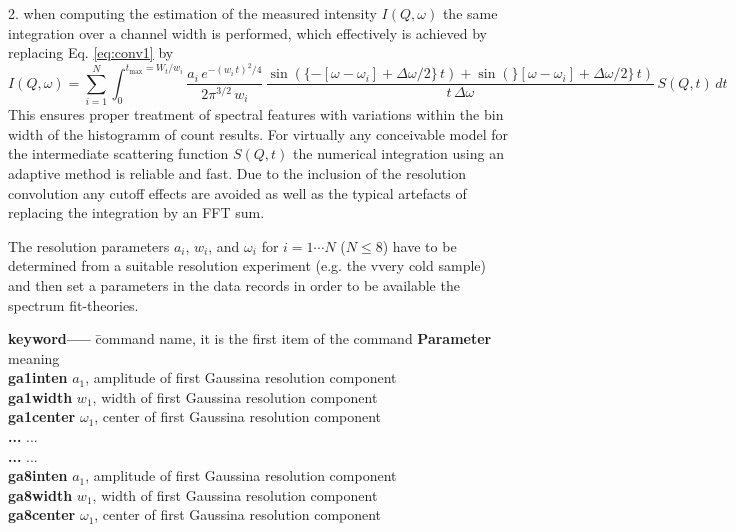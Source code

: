 \documentclass[11pt,fleqn]{book} %
\newcommand{\linespace}{\vspace{4ex}}
\begin{document}
2. when computing the estimation of the measured intensity $I(Q,\omega)$ the same
integration over a channel width is performed, which effectively is achieved by
replacing Eq. \ref{eq:conv1} by
\begin{equation}
\label{eq:conv1}
I(Q,\omega) = \sum_{i=1}^{N} { \int_0^{t_{\max} = W_t/w_i} {
\frac{a_i \, e^{-(w_i \, t)^2/4}}{ 2 \pi^{3/2} \, w_i } \, 
\frac{ 
\sin(\{-[\omega-\omega_i]+\Delta\omega/2\}\, t)+\sin(\}[\omega-\omega_i]+\Delta\omega/2\}\, t)
}{
t \, \Delta\omega
} 
\, S(Q,t) \, dt 
}}
\end{equation}
This ensures proper treatment of spectral features with variations within the 
bin width of the histogramm of count results. For virtually any conceivable model for the
intermediate scattering function $S(Q,t)$ the numerical integration using an adaptive
method is reliable and fast. Due to the inclusion of the resolution convolution any
cutoff effects are avoided as well as the typical artefacts of replacing the integration 
by an FFT sum. 

\linespace

\begin{exercise}
The resolution parameters ${a_i}$, ${w_i}$, and ${\omega_i}$ for ${i=1 \cdots N}$ (${N \le 8}$) 
have to be determined from a suitable resolution experiment (e.g. the vvery cold sample) and
then set a parameters in the data records in order to be available the spectrum fit-theories.
\end{exercise}

\begin{tabbing}
\textbf{keyword-----}  \= command name, it is the first item of the command   \kill
\textbf{Parameter}  \> meaning                                              \\
\textbf{ga1inten  } \>  $a_1$, amplitude of first Gaussina resolution component    \\         
\textbf{ga1width  } \>  $w_1$, width of first Gaussina resolution component    \\         
\textbf{ga1center  }\>  $\omega_1$, center of first Gaussina resolution component    \\         
\textbf{...  }\>  ...    \\         
\textbf{...  }\>  ...    \\         
\textbf{ga8inten  } \>  $a_1$, amplitude of first Gaussina resolution component    \\         
\textbf{ga8width  } \>  $w_1$, width of first Gaussina resolution component    \\         
\textbf{ga8center  }\>  $\omega_1$, center of first Gaussina resolution component    \\ 
\end{tabbing}
\end{document}
